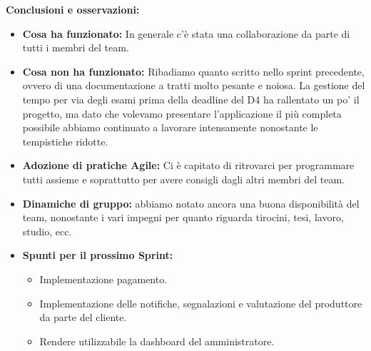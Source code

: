 \textbf{Conclusioni e osservazioni:}
\begin{itemize}
    \item \textbf{Cosa ha funzionato:} In generale c'è stata una collaborazione da parte di tutti i membri del team.
    
    \item \textbf{Cosa non ha funzionato:} Ribadiamo quanto scritto nello sprint precedente, ovvero di una documentazione a tratti molto pesante e noiosa. La gestione del tempo per via degli esami prima della deadline del D4 ha rallentato un po' il progetto, ma dato che volevamo presentare l'applicazione il più completa possibile abbiamo continuato a lavorare intensamente nonostante le tempistiche ridotte.
    
    \item \textbf{Adozione di pratiche Agile:} Ci è capitato di ritrovarci per programmare tutti assieme e soprattutto per avere consigli dagli altri membri del team.
    
    \item \textbf{Dinamiche di gruppo:} abbiamo notato ancora una buona disponibilità del team, nonostante i vari impegni per quanto riguarda tirocini, tesi, lavoro, studio, ecc.
    
    \item \textbf{Spunti per il prossimo Sprint:}
    \begin{itemize}
        \item Implementazione pagamento.
        \item Implementazione delle notifiche, segnalazioni e valutazione del produttore da parte del cliente.
        \item Rendere utilizzabile la dashboard del amministratore.
    \end{itemize}
\end{itemize}